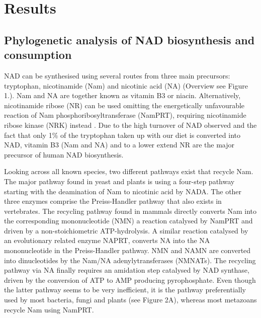 
\section{Results}

\subsection{Phylogenetic analysis of NAD biosynthesis and consumption}

NAD can be synthesised using several routes from three main precursors: tryptophan, nicotinamide (Nam) and nicotinic acid (NA) (Overview see Figure 1.). Nam and NA are together known as vitamin B3 or niacin. Alternatively, nicotinamide ribose (NR) can be used omitting the energetically unfavourable reaction of Nam phosphoribosyltransferase (NamPRT), requiring nicotinamide ribose kinase (NRK) instead \cite{Yoshino2018}. Due to the high turnover of NAD observed and the fact that only 1\% of the tryptophan taken up with our diet is converted into NAD, vitamin B3 (Nam and NA) and to a lower extend NR are the major precursor of human NAD biosynthesis.

Looking across all known species, two different pathways exist that recycle Nam. The major pathway found in yeast and plants is using a four-step pathway starting with the deamination of Nam to nicotinic acid by NADA. The other three enzymes comprise the Preiss-Handler pathway that also exists in vertebrates. The recycling pathway found in mammals directly converts Nam into the corresponding mononucleotide (NMN) a reaction catalysed by NamPRT and driven by a non-stoichiometric ATP-hydrolysis. A similar reaction catalysed by an evolutionary related enzyme NAPRT, converts NA into the NA mononucleotide in the Preiss-Handler pathway. NMN and NAMN are converted into dinucleotides by the Nam/NA adenylytransferases (NMNATs). The recycling pathway via NA finally requires an amidation step catalysed by NAD synthase, driven by the conversion of ATP to AMP producing pyrophosphate. Even though the latter pathway seems to be very inefficient, it is the pathway preferentially used by most bacteria, fungi and plants (see Figure 2A), whereas most metazoans recycle Nam using NamPRT.

